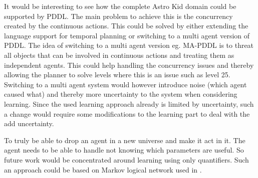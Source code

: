 	It would be interesting to see how the complete Astro Kid domain could be supported by PDDL. The main problem to achieve this is the concurrency created by the continuous actions. This could be solved by either extending the language support for temporal planning or switching to a multi agent version of PDDL. The idea of switching to a multi agent version eg. MA-PDDL is to threat all objects that can be involved in continuous actions and treating them as independent agents. This could help handling the concurrency issues and thereby allowing the planner to solve levels where this is an issue such as level 25. Switching to a multi agent system would however introduce noise (which agent caused what) and thereby more uncertainty to the system when considering learning. Since the used learning approach already is limited by uncertainty, such a change would require some modifications to the learning part to deal with the add uncertainty.  
	

	
 To truly be able to drop an agent in a new universe and make it act in it. The agent needs to be able to handle not knowing which parameters are useful. So future work would be concentrated around learning using only quantifiers. Such an approach could be based on Markov logical network used in \cite{zhuo2010a}. 

		
	